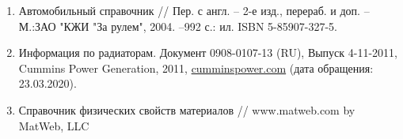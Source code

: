 \begin{enumerate}
%
%
\item
Автомобильный справочник //  Пер. с англ.  -- 2-е изд., перераб. и доп. --М.:ЗАО "КЖИ "За рулем", 2004. --992 с.: ил.  ISBN 5-85907-327-5.
%
\item 
Информация по радиаторам. Документ 0908-0107-13 (RU), Выпуск 4-11-2011, Cummins Power Generation, 2011, \url{cumminspower.com} (дата обращения: 23.03.2020).
%
\item 
Справочник физических свойств материалов //  www.matweb.com   by MatWeb, LLC
%
%
%

%


\end{enumerate}
